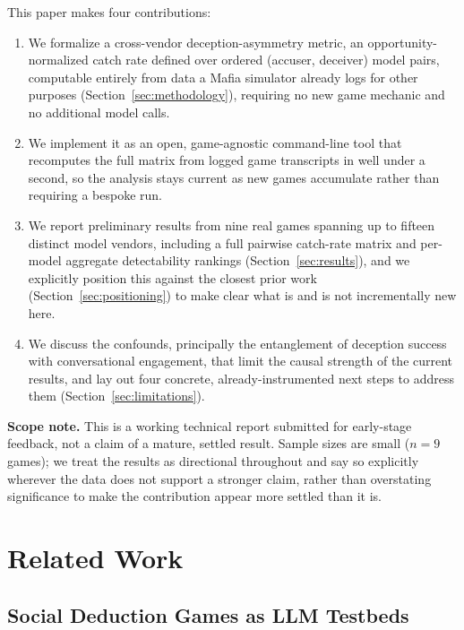 \documentclass{article}
\begin{document}
This paper makes four contributions:
\begin{enumerate}[leftmargin=*]
\item We formalize a cross-vendor deception-asymmetry metric, an opportunity-normalized catch rate defined over ordered (accuser, deceiver) model pairs, computable entirely from data a Mafia simulator already logs for other purposes (Section~\ref{sec:methodology}), requiring no new game mechanic and no additional model calls.
\item We implement it as an open, game-agnostic command-line tool that recomputes the full matrix from logged game transcripts in well under a second, so the analysis stays current as new games accumulate rather than requiring a bespoke run.
\item We report preliminary results from nine real games spanning up to fifteen distinct model vendors, including a full pairwise catch-rate matrix and per-model aggregate detectability rankings (Section~\ref{sec:results}), and we explicitly position this against the closest prior work (Section~\ref{sec:positioning}) to make clear what is and is not incrementally new here.
\item We discuss the confounds, principally the entanglement of deception success with conversational engagement, that limit the causal strength of the current results, and lay out four concrete, already-instrumented next steps to address them (Section~\ref{sec:limitations}).
\end{enumerate}

\textbf{Scope note.} This is a working technical report submitted for early-stage feedback, not a claim of a mature, settled result. Sample sizes are small ($n=9$ games); we treat the results as directional throughout and say so explicitly wherever the data does not support a stronger claim, rather than overstating significance to make the contribution appear more settled than it is.

\section{Related Work}
\label{sec:related}

\subsection{Social Deduction Games as LLM Testbeds}
\end{document}
